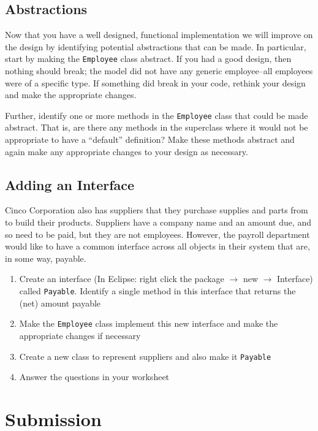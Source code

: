 \documentclass[12pt]{scrartcl}
\begin{document}
\subsection*{Abstractions}

Now that you have a well designed, functional implementation we will 
improve on the design by identifying potential abstractions that can 
be made.  In particular, start by making the \texttt{Employee} 
class abstract.  If you had a good design, then nothing should break; 
the model did not have any generic employee--all employees were of a 
specific type.  If something did break in your code, rethink your 
design and make the appropriate changes.

Further, identify one or more methods in the \texttt{Employee} 
class that could be made abstract.  That is, are there any methods in 
the superclass where it would not be appropriate to have a ``default'' 
definition?  Make these methods abstract and again make any appropriate 
changes to your design as necessary.

\subsection*{Adding an Interface}

Cinco Corporation also has suppliers that they purchase supplies 
and parts from to build their products.  Suppliers have a company 
name and an amount due, and so need to be paid, but they are not 
employees.  However, the payroll department would like to have a 
common interface across all objects in their system that are, in 
some way, payable.  

\begin{enumerate}
  \item Create an interface (In Eclipse: right click the package 
    $\rightarrow$ new $\rightarrow$ Interface) called 
    \texttt{Payable}.  Identify a single method in this 
    interface that returns the (net) amount payable
  \item Make the \texttt{Employee} class implement this 
    new interface and make the appropriate changes if necessary
  \item Create a new class to represent suppliers and also make it 
    \texttt{Payable}
  \item Answer the questions in your worksheet
\end{enumerate}

\section*{Submission}
\end{document}
